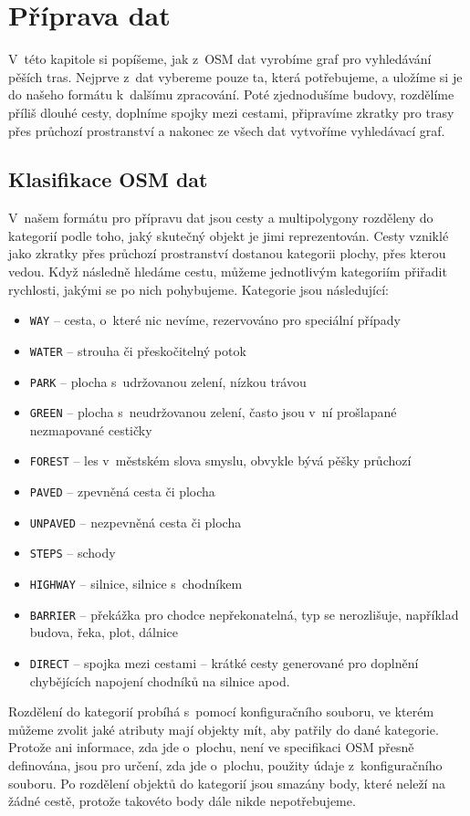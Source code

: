 \chapter{Příprava dat}
V~této kapitole si popíšeme, jak z~OSM dat vyrobíme graf pro vyhledávání pěších
tras. Nejprve z~dat vybereme pouze ta, která potřebujeme, a uložíme si je do
našeho formátu k~dalšímu zpracování. Poté zjednodušíme budovy, rozdělíme příliš
dlouhé cesty, doplníme spojky mezi cestami, připravíme zkratky pro trasy přes
průchozí prostranství a nakonec ze všech dat vytvoříme vyhledávací graf.

\section{Klasifikace OSM dat}
V~našem formátu pro přípravu dat jsou cesty a multipolygony rozděleny do
kategorií podle toho, jaký skutečný objekt je jimi reprezentován. Cesty vzniklé
jako zkratky přes průchozí prostranství dostanou kategorii plochy, přes kterou
vedou. Když následně hledáme cestu, můžeme jednotlivým kategoriím přiřadit
rychlosti, jakými se po nich pohybujeme. Kategorie jsou následující:
\begin{itemize}
	\item \verb|WAY| -- cesta, o~které nic nevíme, rezervováno pro speciální
	případy
	\item \verb|WATER| -- strouha či přeskočitelný potok
	\item \verb|PARK| -- plocha s~udržovanou zelení, nízkou trávou
	\item \verb|GREEN| -- plocha s~neudržovanou zelení, často jsou v~ní
	prošlapané nezmapované cestičky
	\item \verb|FOREST| -- les v~městském slova smyslu, obvykle bývá pěšky
	průchozí
	\item \verb|PAVED| -- zpevněná cesta či plocha
	\item \verb|UNPAVED| -- nezpevněná cesta či plocha
	\item \verb|STEPS| -- schody
	\item \verb|HIGHWAY| -- silnice, silnice s~chodníkem
	\item \verb|BARRIER| -- překážka pro chodce nepřekonatelná, typ se
	nerozlišuje, například budova, řeka, plot, dálnice
	\item \verb|DIRECT| -- spojka mezi cestami -- krátké cesty generované
	pro doplnění chybějících napojení chodníků na silnice apod.
\end{itemize}
Rozdělení do kategorií probíhá s~pomocí konfiguračního souboru, ve kterém můžeme
zvolit jaké atributy mají objekty mít, aby patřily do dané kategorie. Protože
ani informace, zda jde o~plochu, není ve specifikaci OSM přesně definována, jsou
pro určení, zda jde o~plochu, použity údaje z~konfiguračního souboru. Po
rozdělení objektů do kategorií jsou smazány body, které neleží na žádné cestě,
protože takovéto body dále nikde nepotřebujeme.

